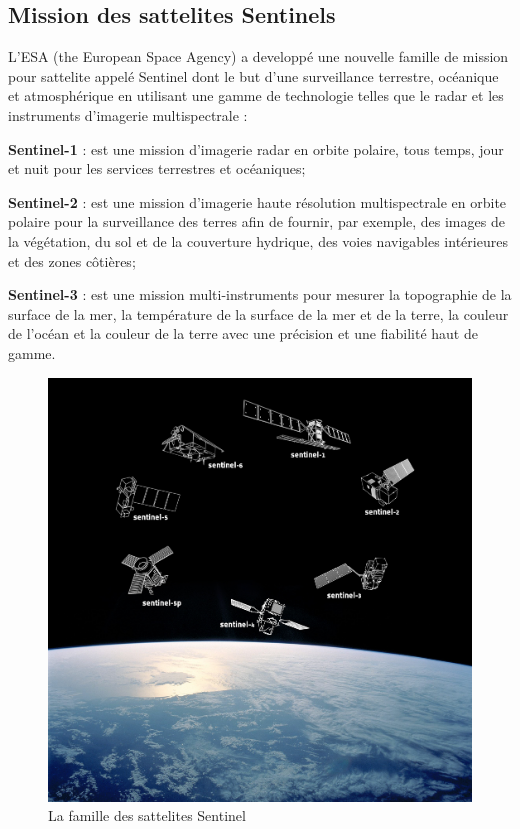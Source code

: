 \documentclass[12pt, openany]{report}
\begin{document}
\subsection{Mission des sattelites Sentinels}
L'ESA (the European Space Agency) a developpé une nouvelle famille de mission pour sattelite appelé Sentinel dont le but d'une surveillance terrestre, océanique et atmosphérique en utilisant une gamme de technologie telles que le radar et les instruments d'imagerie multispectrale :
\begin{mylist}
\item \textbf{Sentinel-1} : est une mission d'imagerie radar en orbite polaire, tous temps, jour et nuit pour les services terrestres et océaniques;
\item \textbf{Sentinel-2} : est une mission d'imagerie haute résolution multispectrale en orbite polaire pour la surveillance des terres afin de fournir, par exemple, des images de la végétation, du sol et de la couverture hydrique, des voies navigables intérieures et des zones côtières;
\item \textbf{Sentinel-3} : est une mission multi-instruments pour mesurer la topographie de la surface de la mer, la température de la surface de la mer et de la terre, la couleur de l'océan et la couleur de la terre avec une précision et une fiabilité haut de gamme.\cite{sentinel}

\begin{figure}[H]
\centering
\includegraphics[scale=0.33]{Sentinel_family.jpg}
\caption{La famille des sattelites Sentinel}
\end{figure}

\end{mylist}
\end{document}
